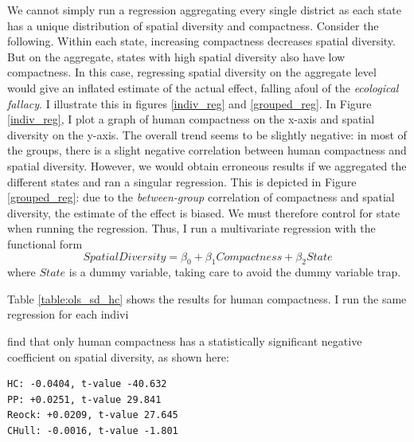 \documentclass[]{article}
\begin{document}
We cannot simply run a regression aggregating every single district as
each state has a unique distribution of spatial diversity and
compactness. Consider the following. Within each state, increasing
compactness decreases spatial diversity. But on the aggregate, states
with high spatial diversity also have low compactness. In this case,
regressing spatial diversity on the aggregate level would give an
inflated estimate of the actual effect, falling afoul of the
\emph{ecological fallacy}. I illustrate this in figures \ref{indiv_reg}
and \ref{grouped_reg}. In Figure \ref{indiv_reg}, I plot a graph of
human compactness on the x-axis and spatial diversity on the y-axis. The
overall trend seems to be slightly negative: in most of the groups,
there is a slight negative correlation between human compactness and
spatial diversity. However, we would obtain erroneous results if we
aggregated the different states and ran a singular regression. This is
depicted in Figure \ref{grouped_reg}: due to the \emph{between-group}
correlation of compactness and spatial diversity, the estimate of the
effect is biased. We must therefore control for state when running the
regression. Thus, I run a multivariate regression with the functional
form \[SpatialDiversity = \beta_0 + \beta_1
Compactness + \beta_2 State\] where \(State\) is a dummy variable,
taking care to avoid the dummy variable trap.

Table \ref{table:ols_sd_hc} shows the results for human compactness. I
run the same regression for each indivi

find that only human compactness has a statistically significant
negative coefficient on spatial diversity, as shown here:

\begin{verbatim}
HC: -0.0404, t-value -40.632
PP: +0.0251, t-value 29.841
Reock: +0.0209, t-value 27.645
CHull: -0.0016, t-value -1.801
\end{verbatim}
\end{document}
